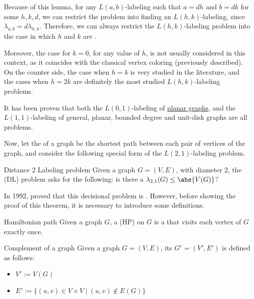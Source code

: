 \documentclass[a4paper, 12pt]{report}
\begin{document}
    Because of this lemma, for any $L(a, b)$-labeling such that $a = dh$ and $b = dk$ for some $h, k, d$, we can restrict the problem into finding an $L(h, k)$-labeling, since $\lambda_{a, b} = d \lambda_{h, k}$. Therefore, we can always restrict the $L(h, k)$-labeling problem into the case in which $h$ and $k$ are .

    Moreover, the case for $k = 0$, for any value of $h$, is not usually considered in this context, as it coincides with the classical vertex coloring (previously described). On the counter side, the case when $h = k$ is very studied in the literature, and the cases when $h = 2k$ are definitely the most studied $L(h, k)$-labeling problems.

    It has been proven that both the $L(0,1)$-labeling of \href{https://en.wikipedia.org/wiki/Planar_graph}{planar graphs}, and the $L(1,1)$-labeling of general, planar, bounded degree and unit-disk graphs are all \NPComplete problems.

    Now, let the  of a graph be the shortest path between each pair of vertices of the graph, and consider the following special form of the $L(2,1)$-labeling problem.

    \begin{frameddefn}{Distance 2 Labeling problem}
        Given a graph $G = (V, E)$, with diameter 2, the   (DL) problem asks for the following: is there a $\lambda_{2,1}(G) \le \abs{V(G)}$?
    \end{frameddefn}

    In 1992, \textcite{griggs} proved that this decisional problem is \NPComplete. However, before showing the proof of this theorem, it is necessary to introduce some definitions.

    \begin{frameddefn}{Hamiltonian path}
        Given a graph $G$, a  (HP) on $G$ is a  that visits each vertex of $G$ exactly once.
    \end{frameddefn}

    \begin{frameddefn}{Complement of a graph}
        Given a graph $G = (V, E)$, its  $G^c = (V', E')$ is defined as follows:

        \begin{itemize}
            \item $V' := V(G)$
            \item $E' := \{(u, v) \in V \times V \mid (u,v) \notin E(G)\}$
        \end{itemize}
    \end{frameddefn}
\end{document}
